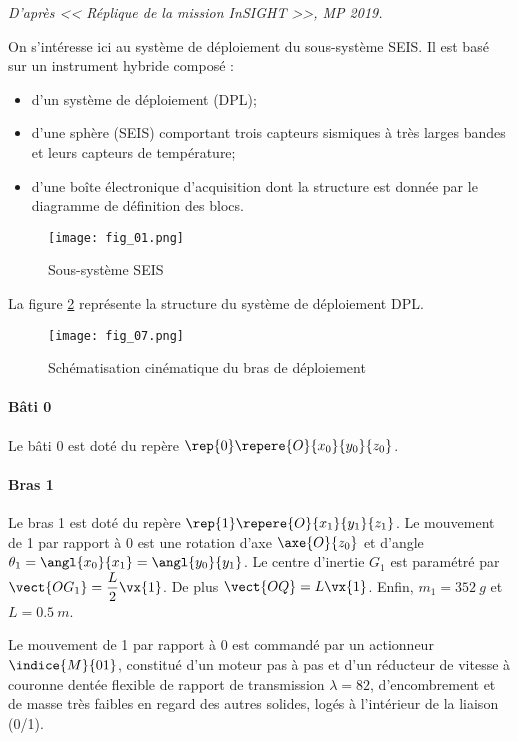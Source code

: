 
\textit{D'après << Réplique de la mission InSIGHT >>, MP 2019.}

On s'intéresse ici au système de déploiement du sous-système SEIS. Il est basé sur un instrument hybride composé :
\begin{itemize}
\item d'un système de déploiement (DPL);
\item d'une sphère (SEIS) comportant trois capteurs sismiques à très larges bandes et leurs capteurs de
température;
\item d'une boîte électronique d'acquisition dont la structure est donnée par le diagramme de
définition des blocs. 
\end{itemize}

\begin{figure}[!h]
\centering
\texttt{[image: fig\_01.png]}
\caption{Sous-système SEIS \label{fig_01}}
\end{figure}


La figure \ref{fig_07} représente la structure du système de déploiement DPL.

\begin{figure}[!h]
\centering
\texttt{[image: fig\_07.png]}
\caption{Schématisation cinématique du bras de déploiement \label{fig_07}}
\end{figure}




\paragraph*{Bâti 0}
Le bâti 0 est doté du repère $\rep{0} \repere{O}{x_0}{y_0}{z_0}$.

\paragraph*{Bras 1}

Le bras 1 est doté du repère $\rep{1} \repere{O}{x_1}{y_1}{z_1}$. Le mouvement de 1 par rapport à 0 est une rotation d'axe $\axe{O}{z_0}$  et d'angle $\theta_1 = \angl{x_0}{x_1}= \angl{y_0}{y_1}$. Le centre d'inertie $G_1$ est paramétré par $\vect{OG_1} = \dfrac{L}{2} \vx{1}$. De plus $\vect{OQ} = L\vx{1}$. Enfin, $m_1 = \SI{352}{g}$ et $L=\SI{0,5}{m}$.


Le mouvement de 1 par rapport à 0 est commandé par un actionneur $\indice{M}{01}$, constitué d’un moteur pas à pas et d’un réducteur de vitesse à couronne dentée flexible de rapport de transmission $\lambda = 82$, d’encombrement et de masse très faibles en regard des autres solides, logés à l’intérieur de la liaison (0/1).


